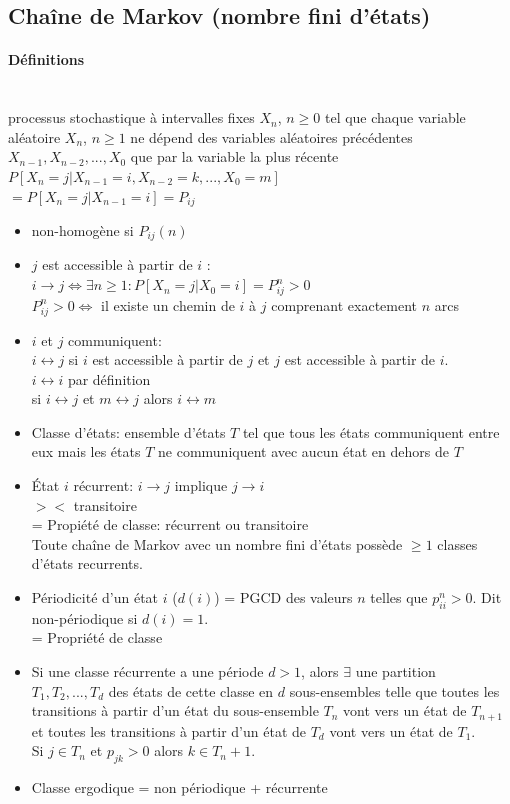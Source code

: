 \documentclass[paper=a4,fontsize=8pt,pagesize,DIV=calc]{scrartcl}
\newcounter{row}
\begin{document}
\begin{multicols}{3}
\section{Chaîne de Markov (nombre fini d'états)}
\paragraph{Définitions}~~\\
processus stochastique à intervalles fixes {$X_n$, $n \geq 0$} tel que chaque
variable aléatoire $X_n$, $n \geq 1$ ne dépend des variables aléatoires précédentes $X_{n-1},X_{n-2}, . . . ,X_0$ que par la
variable la plus récente \\
$P[X_n = j|X_{n-1} = i,X_{n-2} = k, . . . ,X_0 = m] $\\$= P[X_n = j|X_{n-1} = i] = P_{ij}$
\begin{itemize}
\item non-homogène si $P_{ij}(n)$
\item $j$ est accessible à partir de $i$ :\\ $i \rightarrow j \Leftrightarrow \exists n \geq 1 : P[X_n = j|X_0 = i] = P^n_{ij} > 0$ 
\\ $P^n_{ij} > 0 \Leftrightarrow$ il existe un chemin de $i$ à $j$ comprenant exactement $n$ arcs
\item $i$ et $j$ communiquent:\\
$i \leftrightarrow j$ si $i$ est accessible à partir de $j$ et $j$ est accessible à partir de $i$.
\\ $i \leftrightarrow i$ par définition
\\ si $i\leftrightarrow j$ et $m\leftrightarrow j$ alors $i \leftrightarrow m$
\item Classe d’états: ensemble d’états $T$ tel que tous les états communiquent entre eux mais les états $T$ ne communiquent avec aucun état en dehors de $T$
\item État  $i$ récurrent: $i \rightarrow j$ implique $j \rightarrow i$
\\$><$ transitoire
\\ = Propiété de classe: récurrent ou transitoire
\\ Toute chaîne de Markov avec un nombre fini d’états possède $\geq 1$ classes d’états recurrents.
\item Périodicité d’un état $i$ ($d(i)$) = PGCD des valeurs $n$ telles que $p^n_{ii} > 0$. Dit non-périodique si $d(i)=1$.
\\ = Propriété de classe
\item Si une classe récurrente a une période $d > 1$, alors $\exists$ une partition $T_1, T_2, . . . , T_d$ des états de cette classe en $d$
sous-ensembles telle que toutes les transitions à partir d’un état du sous-ensemble $T_n$ vont vers un état de $T_{n+1}$ et toutes les transitions à partir d’un état de $T_d$ vont vers un état de $T_1$.
\\ Si $j\in T_n$ et $p_{jk} > 0$ alors $k \in T_n+1$.
\item Classe ergodique = non périodique + récurrente
\end{itemize}


\end{multicols}
\end{document}
